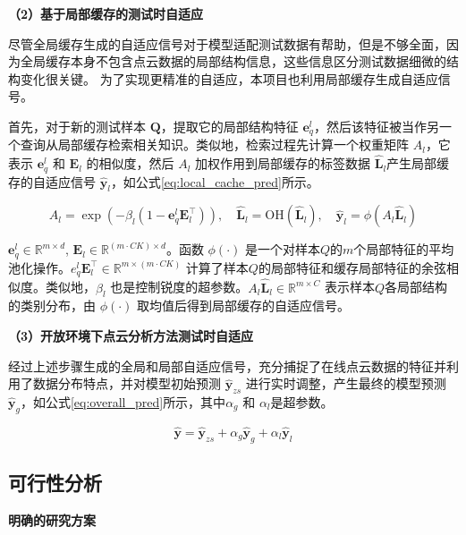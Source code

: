 \documentclass[12pt]{article}
\newcommand{\myEmph}[1]{\textbf{\textcolor[rgb]{0,0,0.25}{#1}}}
\begin{document}
\myEmph{（2）基于局部缓存的测试时自适应}

尽管全局缓存生成的自适应信号对于模型适配测试数据有帮助，但是不够全面，因为全局缓存本身不包含点云数据的局部结构信息，这些信息区分测试数据细微的结构变化很关键。
为了实现更精准的自适应，本项目也利用局部缓存生成自适应信号。

首先，对于新的测试样本 $\boldsymbol{Q}$，提取它的局部结构特征 $\textbf{e}_q^{l}$，然后该特征被当作另一个查询从局部缓存检索相关知识。类似地，检索过程先计算一个权重矩阵 $A_{l}$，它表示 $\textbf{e}_q^{l}$ 和 $\textbf{E}_{l}$ 的相似度，然后 $A_{l}$ 加权作用到局部缓存的标签数据 $\hat{\textbf{L}}_{l}$产生局部缓存的自适应信号 $\hat{\textbf{y}}_{l}$，如公式\ref{eq:local_cache_pred}所示。

\begin{equation}
    A_l = \exp(-\beta_l(1 - \textbf{e}_q^{l} \textbf{E}_{l}^\top)),\quad \hat{\textbf{L}}_{l} = \textrm{OH}(\hat{\textbf{L}}_{l}),\quad \hat{\textbf{y}}_{l} = \phi(A_{l} \hat{\textbf{L}}_{l})
    \label{eq:local_cache_pred}
\end{equation}

$\textbf{e}_q^{l} \in \mathbb{R}^{m\times d}$, $\textbf{E}_{l} \in \mathbb{R}^{(m\cdot CK)\times d}$。函数 $\phi(\cdot)$ 是一个对样本$Q$的$m$个局部特征的平均池化操作。$e_q^{l} \textbf{E}_{l}^\top \in \mathbb{R}^{m\times (m\cdot CK)}$ 计算了样本$Q$的局部特征和缓存局部特征的余弦相似度。类似地，$\beta_l$ 也是控制锐度的超参数。$A_{l} \hat{\textbf{L}}_{l} \in \mathbb{R}^{m\times C}$ 表示样本$Q$各局部结构的类别分布，由 $\phi(\cdot)$ 取均值后得到局部缓存的自适应信号。

\myEmph{（3）开放环境下点云分析方法测试时自适应}

经过上述步骤生成的全局和局部自适应信号，充分捕捉了在线点云数据的特征并利用了数据分布特点，并对模型初始预测 $\hat{\textbf{y}}_{zs}$ 进行实时调整，产生最终的模型预测 $\hat{\textbf{y}}_g$，如公式\ref{eq:overall_pred}所示，其中$\alpha_{g}$ 和 $\alpha_{l}$是超参数。

\begin{equation}
    \hat{\textbf{y}} = \hat{\textbf{y}}_{zs} + \alpha_g \hat{\textbf{y}}_{g} + \alpha_l \hat{\textbf{y}}_{l}
    \label{eq:overall_pred}
\end{equation}

\subsection{可行性分析}

\myEmph{明确的研究方案}
\end{document}
